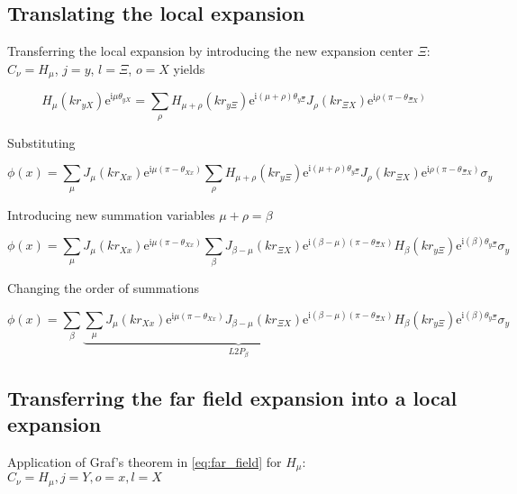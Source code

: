 \documentclass[11pt,a4paper]{article}
\newcommand{\ti}{\mathrm{i}}
\newcommand{\te}{\mathrm{e}}
\begin{document}
\subsection{Translating the local expansion}

Transferring the local expansion by introducing the new expansion center $\Xi$: 
$C_{\nu} = H_{\mu}$, $j = y$, $l = \Xi$, $o = X$ yields

\begin{equation}
	H_{\mu}(k r_{yX})
	\te^{\ti \mu \theta_{yX}}
	=
	\sum_{\rho} H_{\mu + \rho}(k r_{y\Xi })
	\te^{\ti (\mu + \rho) \theta_{y\Xi }}
	J_{\rho}(k r_{\Xi X})
	\te^{\ti \rho(\pi-\theta_{\Xi X})}
\end{equation}

Substituting

\begin{equation}
	\phi(x)
	=
	\sum_{\mu}
	J_{\mu}(k r_{Xx})
	\te^{\ti \mu(\pi-\theta_{Xx})}
%	
	\sum_{\rho} H_{\mu + \rho}(k r_{y\Xi })
	\te^{\ti (\mu + \rho) \theta_{y\Xi }}
	J_{\rho}(k r_{\Xi X})
	\te^{\ti \rho(\pi-\theta_{\Xi X})}
%	
	\sigma_y
\end{equation}

Introducing new summation variables $\mu + \rho = \beta$

\begin{equation}
	\phi(x)
	=
	\sum_{\mu}
	J_{\mu}(k r_{Xx})
	\te^{\ti \mu(\pi-\theta_{Xx})}
%	
	\sum_{\beta}
	J_{\beta-\mu}(k r_{\Xi X})
	\te^{\ti (\beta-\mu)(\pi-\theta_{\Xi X})}
%
	H_{\beta}(k r_{y\Xi })
	\te^{\ti (\beta) \theta_{y\Xi }}
%	
	\sigma_y
\end{equation}

Changing the order of summations


\begin{equation}
	\phi(x)
	=
	\sum_{\beta}
%	
	\underbrace{
	\sum_{\mu}
	J_{\mu}(k r_{Xx})
	\te^{\ti \mu(\pi-\theta_{Xx})}
%	
	J_{\beta-\mu}(k r_{\Xi X})
	\te^{\ti (\beta-\mu)(\pi-\theta_{\Xi X})}
	}_{L2P_{\beta}}
%
	H_{\beta}(k r_{y\Xi })
	\te^{\ti (\beta) \theta_{y\Xi }}
%	
	\sigma_y
\end{equation}





\subsection{Transferring the far field expansion into a local expansion}

Application of Graf's theorem in \eqref{eq:far_field} for $H_{\mu}$:
$C_{\nu} = H_{\mu}, j = Y, o = x, l = X$
\end{document}
